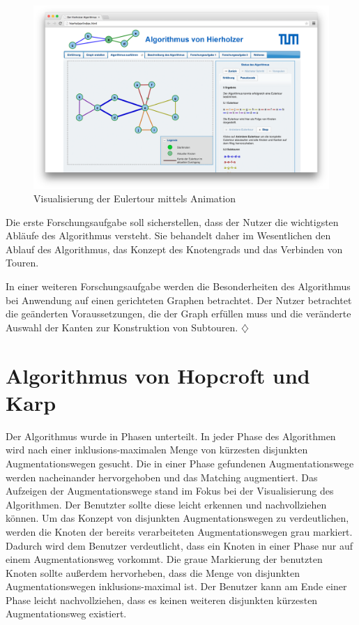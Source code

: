 \begin{figure}[h!]
	\centering
	\includegraphics[width=\textwidth]{figures/hierholzer_animation}
	\caption[Hierholzer: Eulertour Animation]{Visualisierung der Eulertour mittels Animation}\label{fig:hierholzer-animation}
\end{figure}

Die erste Forschungsaufgabe soll sicherstellen, dass der Nutzer die wichtigsten Abläufe des Algorithmus versteht. Sie behandelt daher im Wesentlichen den Ablauf des Algorithmus, das Konzept des Knotengrads und das Verbinden von Touren.

In einer weiteren Forschungsaufgabe werden die Besonderheiten des Algorithmus bei Anwendung auf einen gerichteten Graphen betrachtet. Der Nutzer betrachtet die geänderten Voraussetzungen, die der Graph erfüllen muss und die veränderte Auswahl der Kanten zur Konstruktion von Subtouren. \hfill$\diamondsuit$
     
\section{Algorithmus von Hopcroft und Karp} %
Der Algorithmus wurde in Phasen unterteilt. In jeder Phase des Algorithmen wird nach einer inklusions-maximalen Menge von kürzesten disjunkten Augmentationswegen gesucht. Die in einer Phase gefundenen Augmentationswege werden nacheinander hervorgehoben und das Matching augmentiert.
Das Aufzeigen der Augmentationswege stand im Fokus bei der Visualisierung des Algorithmen. Der Benutzter sollte diese leicht erkennen und nachvollziehen können. Um das Konzept von disjunkten Augmentationswegen zu verdeutlichen, werden die Knoten der bereits verarbeiteten Augmentationswegen grau markiert. Dadurch wird dem Benutzer verdeutlicht, dass ein Knoten in einer Phase nur auf einem Augmentationsweg vorkommt. 
Die graue Markierung der benutzten Knoten sollte außerdem hervorheben, dass die Menge von disjunkten Augmentationswegen inklusions-maximal ist. Der Benutzer kann am Ende einer Phase leicht nachvollziehen, dass es keinen weiteren disjunkten kürzesten Augmentationsweg existiert.


